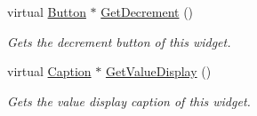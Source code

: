 \begin{DoxyCompactItemize}
virtual \hyperlink{classphys_1_1UI_1_1Button}{Button} $\ast$ \hyperlink{classphys_1_1UI_1_1Spinner_af6f05d36565da18b8a57c3f50f8eb73d}{GetDecrement} ()
\begin{DoxyCompactList}\small\item\em Gets the decrement button of this widget. \item\end{DoxyCompactList}\item 
virtual \hyperlink{classphys_1_1UI_1_1Caption}{Caption} $\ast$ \hyperlink{classphys_1_1UI_1_1Spinner_a65497e1c3cb290172dfedcb6ecbc9e8f}{GetValueDisplay} ()
\begin{DoxyCompactList}\small\item\em Gets the value display caption of this widget. \item\end{DoxyCompactList}\end{DoxyCompactItemize}

